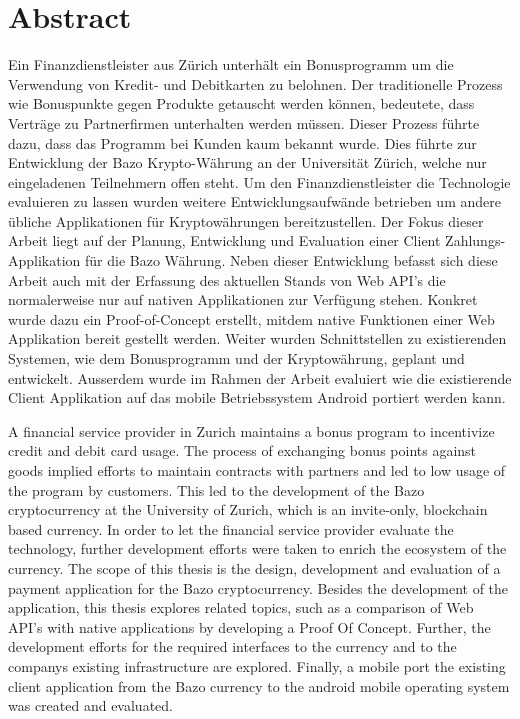 \chapter*{Abstract}

Ein Finanzdienstleister aus Zürich unterhält ein Bonusprogramm um die Verwendung von Kredit- und Debitkarten zu belohnen. Der traditionelle Prozess wie Bonuspunkte gegen Produkte getauscht werden können, bedeutete, dass Verträge zu Partnerfirmen unterhalten werden müssen. Dieser Prozess führte dazu, dass das Programm bei Kunden kaum bekannt wurde. Dies führte zur Entwicklung der Bazo Krypto-Währung an der Universität Zürich, welche nur eingeladenen Teilnehmern offen steht. Um den Finanzdienstleister die Technologie evaluieren zu lassen wurden weitere Entwicklungsaufwände betrieben um andere übliche Applikationen für Kryptowährungen bereitzustellen. Der Fokus dieser Arbeit liegt auf der Planung, Entwicklung und Evaluation einer Client Zahlungs-Applikation für die Bazo Währung. Neben dieser Entwicklung befasst sich diese Arbeit auch mit der Erfassung des aktuellen Stands von Web API's die normalerweise nur auf nativen Applikationen zur Verfügung stehen. Konkret wurde dazu ein Proof-of-Concept erstellt, mitdem native Funktionen einer Web Applikation bereit gestellt werden. Weiter wurden Schnittstellen zu existierenden Systemen, wie dem Bonusprogramm und der Kryptowährung, geplant und entwickelt. Ausserdem wurde im Rahmen der Arbeit evaluiert wie die existierende Client Applikation auf das mobile Betriebssystem Android portiert werden kann.

A financial service provider in Zurich maintains a bonus program to incentivize credit and debit card usage. The process of exchanging bonus points against goods implied efforts to maintain contracts with partners and led to low usage of the program by customers. This led to the development of the Bazo cryptocurrency at the University of Zurich, which is an invite-only, blockchain based currency. In order to let the financial service provider evaluate the technology, further development efforts were taken to enrich the ecosystem of the currency. The scope of this thesis is the design, development and evaluation of a payment application for the Bazo cryptocurrency. Besides the development of the application, this thesis explores related topics, such as a comparison of Web API's with native applications by developing a Proof Of Concept. Further, the development efforts for the required interfaces to the currency and to the companys existing infrastructure are explored. Finally, a mobile port the existing client application from the Bazo currency to the android mobile operating system was created and evaluated.

